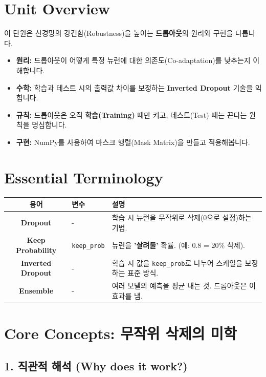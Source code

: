 \documentclass[11pt,a4paper]{book}
\theoremstyle{definition}
\begin{document}
\section{Unit Overview}
\begin{summarybox}[title={핵심 목표}]
이 단원은 신경망의 강건함(Robustness)을 높이는 \textbf{드롭아웃}의 원리와 구현을 다룹니다.
\begin{itemize}
    \item \textbf{원리:} 드롭아웃이 어떻게 특정 뉴런에 대한 의존도(Co-adaptation)를 낮추는지 이해합니다.
    \item \textbf{수학:} 학습과 테스트 시의 출력값 차이를 보정하는 \textbf{Inverted Dropout} 기술을 익힙니다.
    \item \textbf{규칙:} 드롭아웃은 오직 \textbf{학습(Training)} 때만 켜고, 테스트(Test) 때는 끈다는 원칙을 명심합니다.
    \item \textbf{구현:} NumPy를 사용하여 마스크 행렬(Mask Matrix)을 만들고 적용해봅니다.
\end{itemize}
\end{summarybox}

\section{Essential Terminology}
\begin{center}
\begin{tabular}{|c|l|l|}
\hline
\textbf{용어} & \textbf{변수} & \textbf{설명} \\ \hline
\textbf{Dropout} & - & 학습 시 뉴런을 무작위로 삭제(0으로 설정)하는 기법. \\ \hline
\textbf{Keep Probability} & \texttt{keep\_prob} & 뉴런을 \textbf{'살려둘'} 확률. (예: 0.8 = 20\% 삭제). \\ \hline
\textbf{Inverted Dropout} & - & 학습 시 값을 \texttt{keep\_prob}로 나누어 스케일을 보정하는 표준 방식. \\ \hline
\textbf{Ensemble} & - & 여러 모델의 예측을 평균 내는 것. 드롭아웃은 이 효과를 냄. \\ \hline
\end{tabular}
\end{center}

\section{Core Concepts: 무작위 삭제의 미학}

\subsection{1. 직관적 해석 (Why does it work?)}
\end{document}
